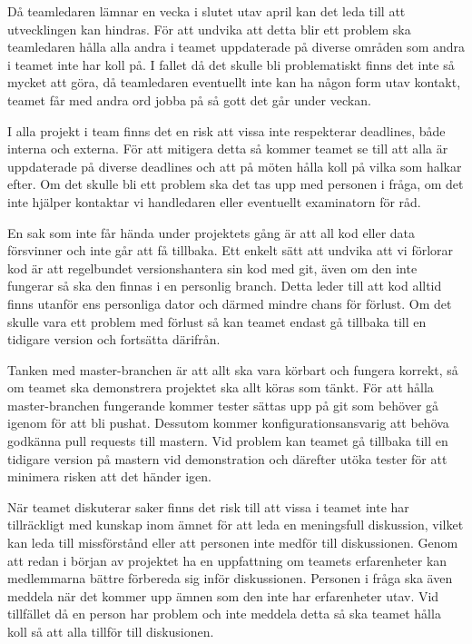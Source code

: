 {
    Då teamledaren lämnar en vecka i slutet utav april kan det leda till att utvecklingen kan
    hindras. För att undvika att detta blir ett problem ska teamledaren hålla alla andra i
    teamet uppdaterade på diverse områden som andra i teamet inte har koll på. I fallet då det skulle bli
    problematiskt finns det inte så mycket att göra, då teamledaren eventuellt inte kan ha någon form utav kontakt,
    teamet får med andra ord jobba på så gott det går under veckan.
}

{
   I alla projekt i team finns det en risk att vissa inte respekterar deadlines, både interna och
   externa. För att mitigera detta så kommer teamet se till att alla är uppdaterade på
   diverse deadlines och att på möten hålla koll på vilka som halkar efter. Om det skulle bli
   ett problem ska det tas upp med personen i fråga, om det inte hjälper kontaktar vi handledaren
   eller eventuellt examinatorn för råd.
}

{
    En sak som inte får hända under projektets gång är att all kod eller data försvinner och 
    inte går att få tillbaka. Ett enkelt sätt att undvika att vi förlorar kod är att regelbundet
    versionshantera sin kod med git, även om den inte fungerar så ska den finnas i en personlig
    branch. Detta leder till att kod alltid finns utanför ens personliga dator och därmed mindre
    chans för förlust. Om det skulle vara ett problem med förlust så kan teamet endast gå 
    tillbaka till en tidigare version och fortsätta därifrån.
}

{
    Tanken med master-branchen är att allt ska vara körbart och fungera korrekt, så om teamet ska
    demonstrera projektet ska allt köras som tänkt. För att hålla master-branchen fungerande
    kommer tester sättas upp på git som behöver gå igenom för att bli pushat. Dessutom kommer
    konfigurationsansvarig att behöva godkänna pull requests till mastern. Vid problem kan teamet
    gå tillbaka till en tidigare version på mastern vid demonstration och därefter utöka tester
    för att minimera risken att det händer igen.
}

{
   När teamet diskuterar saker finns det risk till att vissa i teamet inte har tillräckligt med
   kunskap inom ämnet för att leda en meningsfull diskussion, vilket kan leda till missförstånd
   eller att personen inte medför till diskussionen. Genom att redan i början av projektet ha en uppfattning om teamets erfarenheter kan medlemmarna bättre förbereda sig
   inför diskussionen. Personen i fråga ska även meddela när det kommer upp ämnen som den inte
   har erfarenheter utav. Vid tillfället då en person har problem och inte meddela detta så
   ska teamet hålla koll så att alla tillför till diskusionen.
}

\pagebreak
